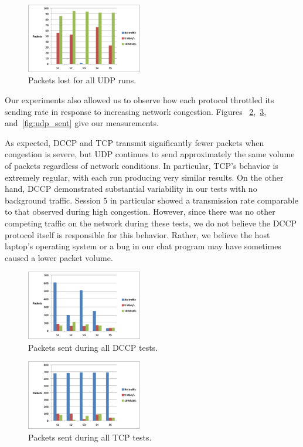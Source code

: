 \begin{figure}[!h]
   \centering
      \includegraphics[width=0.45\textwidth]{pics/udp_losses}
   \caption{Packets lost for all UDP runs.}
\label{fig:udp_losses}
\end{figure}

Our experiments also allowed us to observe how each protocol throttled its
sending rate in response to increasing network congestion. Figures
~\ref{fig:dccp_sent},~\ref{fig:tcp_sent}, and~\ref{fig:udp_sent} give our
measurements.

As expected, DCCP and TCP transmit significantly fewer packets when congestion
is severe, but UDP continues to send approximately the same volume of packets
regardless of network conditions. In particular, TCP's behavior is extremely
regular, with each run producing very similar results. On the other hand, DCCP
demonstrated substantial variability in our tests with no background traffic.
Session 5 in particular showed a transmission rate comparable to that observed
during high congestion. However, since there was no other competing traffic on
the network during these tests, we do not believe the DCCP protocol itself is
responsible for this behavior. Rather, we believe the host laptop's operating
system or a bug in our chat program may have sometimes caused a lower packet
volume.

\begin{figure}[!h]
   \centering
      \includegraphics[width=0.45\textwidth]{pics/dccp_sent}
   \caption{Packets sent during all DCCP tests.}
\label{fig:dccp_sent}
\end{figure}

\begin{figure}[!h]
   \centering
      \includegraphics[width=0.45\textwidth]{pics/tcp_sent}
   \caption{Packets sent during all TCP tests.}
\label{fig:tcp_sent}
\end{figure}

